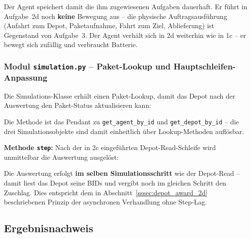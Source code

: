 

Der Agent speichert damit die ihm zugewiesenen Aufgaben dauerhaft. Er führt in Aufgabe~2d noch \textbf{keine} Bewegung aus -- die physische Auftragsausführung (Anfahrt zum Depot, Paketaufnahme, Fahrt zum Ziel, Ablieferung) ist Gegenstand von Aufgabe~3. Der Agent verhält sich in 2d weiterhin wie in 1c -- er bewegt sich zufällig und verbraucht Batterie.


\subsubsection{Modul \texttt{simulation.py} – Paket-Lookup und Hauptschleifen-Anpassung}

Die Simulations-Klasse erhält einen Paket-Lookup, damit das Depot nach der Auswertung den Paket-Status aktualisieren kann:



Die Methode ist das Pendant zu \texttt{get\_agent\_by\_id} und \texttt{get\_depot\_by\_id} -- die drei Simulationsobjekte sind damit einheitlich über Lookup-Methoden auflösbar.

\textbf{Methode \texttt{step}:} Nach der in 2c eingeführten Depot-Read-Schleife wird unmittelbar die Auswertung ausgelöst:



Die Auswertung erfolgt \textbf{im selben Simulationsschritt} wie der Depot-Read -- damit liest das Depot seine BIDs und vergibt noch im gleichen Schritt den Zuschlag. Dies entspricht dem in Abschnitt~\ref{sssec:depot_award_2d} beschriebenen Prinzip der asynchronen Verhandlung ohne Step-Lag.


\subsection{Ergebnisnachweis}
\label{sssec:zuschlag_2d_nachweis}

